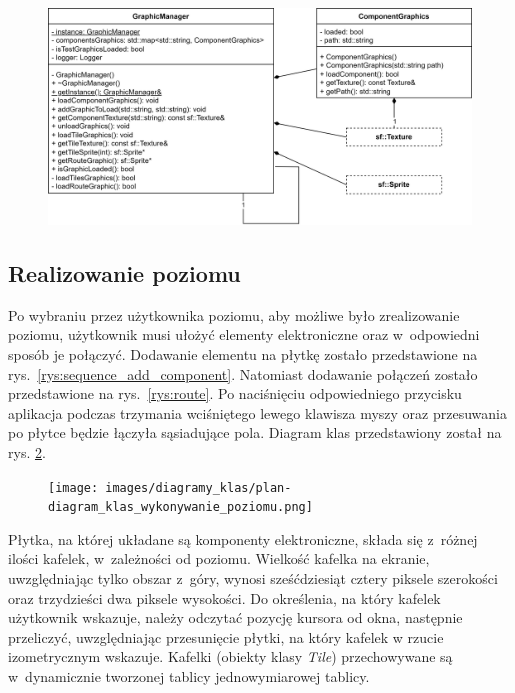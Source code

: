 \documentclass[12pt, a4paper]{article} %
\begin{document}
\begin{figure}[h]
	\centering
	\includegraphics[width=15cm]{images/diagramy_klas/plan-diagram_klas_grafika.png}
	\caption{}
	\label{rys:diagram_klas_grafika}
\end{figure}



\subsection{Realizowanie poziomu}

\aka Po wybraniu przez użytkownika poziomu, aby możliwe było zrealizowanie poziomu, użytkownik musi ułożyć elementy elektroniczne oraz w~odpowiedni sposób je połączyć. Dodawanie elementu na płytkę zostało przedstawione na rys.~\ref{rys:sequence_add_component}. 
Natomiast dodawanie połączeń zostało przedstawione na rys.~\ref{rys:route}. Po naciśnięciu odpowiedniego przycisku aplikacja podczas trzymania wciśniętego lewego klawisza myszy oraz przesuwania po płytce będzie łączyła sąsiadujące pola. Diagram klas przedstawiony został na rys. \ref{rys:diagram_klas_realizowanie_poziomu}.

\begin{landscape}
\begin{figure}
	\centering
	\texttt{[image: images/diagramy\_klas/plan-diagram\_klas\_wykonywanie\_poziomu.png]}
	\caption{}
	\label{rys:diagram_klas_realizowanie_poziomu}
\end{figure}
\end{landscape}

\aka Płytka, na której układane są komponenty elektroniczne, składa się z~różnej ilości kafelek, w~zależności od poziomu. Wielkość kafelka na ekranie, uwzględniając tylko obszar z~góry, wynosi sześćdziesiąt cztery piksele szerokości oraz trzydzieści dwa piksele wysokości.
Do określenia, na który kafelek użytkownik wskazuje, należy odczytać pozycję kursora od okna, następnie przeliczyć, uwzględniając przesunięcie płytki, na który kafelek w rzucie izometrycznym wskazuje. Kafelki (obiekty klasy \textit{Tile}) przechowywane są w~dynamicznie tworzonej tablicy jednowymiarowej tablicy.
\end{document}

